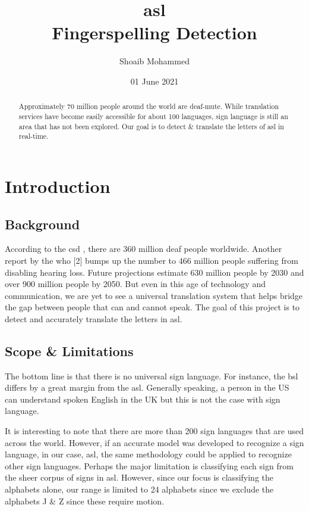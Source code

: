 \documentclass[twocolumn]{article}
\title{\gls{asl}\\
	Fingerspelling Detection}
\author{Shoaib Mohammed}
\date{01 June 2021}
\begin{document}
\begin{titlingpage}
\maketitle
\end{titlingpage}

\begin{abstract}
Approximately 70 million people around the world are deaf-mute. While 
translation services have become easily accessible for about 100 
languages, sign language is still an area that has not been explored. 
Our goal is to detect \& translate the letters of \gls{asl} in real-time.
\end{abstract}

\section{Introduction}

\subsection{Background}
According to the \gls{csd} \cite{csd}, there are 360 million deaf people 
worldwide. Another report by the \gls{who} [2] bumps up the number to 466 
million people suffering from disabling hearing loss. Future projections 
estimate 630 million people by 2030 and over 900 million people by 2050. 
But even in this age of technology and communication, we are yet to see a 
universal translation system that helps bridge the gap between people that 
can and cannot speak. The goal of this project is to detect and accurately 
translate the letters in \gls{asl}.

\subsection{Scope \& Limitations}
The bottom line is that there is no universal sign language. For instance, the 
\gls{bsl} differs by a great margin from the \gls{asl}. Generally speaking, a 
person in the US can understand spoken English in the UK but this is not the 
case with sign language.

It is interesting to note that there are more than 200 sign languages that are 
used across the world. However, if an accurate model was developed to 
recognize a sign language, in our case, \gls{asl}, the same methodology could be 
applied to recognize other sign languages. Perhaps the major limitation is 
classifying each sign from the sheer corpus of signs in \gls{asl}.
However, since our focus is classifying the alphabets alone, our range is 
limited to 24 alphabets since we exclude the alphabets J \& Z since these 
require motion.
\end{document}
